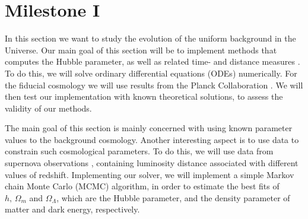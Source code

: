 \section{Milestone I}\label{M1}
In this section we want to study the evolution of the uniform background in the Universe. Our main goal of this section will be to implement methods that computes the Hubble parameter, as well as related time- and distance measures . To do this, we will solve  ordinary differential equations (ODEs) numerically. For the fiducial cosmology we will use results from the Planck Collaboration \cite*{Planck2020}. We will then test our implementation with known theoretical solutions, to assess the validity of our methods. 

The main goal of this section is mainly concerned with using known parameter values to  the background cosmology. Another interesting aspect is to use data to constrain such cosmological parameters. To do this, we will use data from supernova observations \cite{Supernova2014Betoule}, containing luminosity distance associated with different values of redshift. Implementing our solver, we will implement a simple Markov chain Monte Carlo (MCMC) algorithm, in order to estimate the best fits of $h,\,\Omega_m$ and $\Omega_\Lambda$, which are the Hubble parameter, and the density parameter of matter and dark energy, respectively.   









